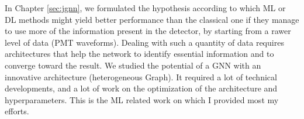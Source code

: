 \documentclass[../main.tex]{subfiles}
\begin{document}
%
%
%
%
%

In Chapter \ref{sec:jgnn}, we formulated the hypothesis according to which ML or DL methods might yield better performance than the classical one if they manage to use more of the information present in the detector, by starting from a rawer level of data (PMT waveforms). Dealing with such a quantity of data requires architectures that help the network to identify essential information and to converge toward the result. We studied the potential of a GNN with an innovative architecture (heterogeneous Graph). It required a lot of technical developments, and a lot of work on the optimization of the architecture and hyperparameters. This is the ML related work on which I provided most my efforts.
\end{document}
